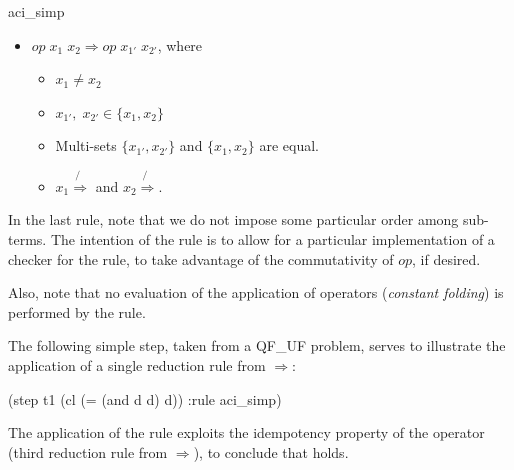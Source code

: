 \begin{RuleDescription}{aci_simp}
\begin{itemize}
\item $op \; x_1 \; x_2 \Rightarrow op \; x_{1'} \; x_{2'}$, 
            where 
            \begin{itemize}
            \item $x_1 \neq x_2$
            \item $x_{1'}, \; x_{2'} \in \{ x_1, x_2\}$
              
            \item Multi-sets $\{x_{1'}, x_{2'}\}$ and $\{x_1, x_2\}$ are equal.
              
              \item $x_1 \not{\Rightarrow}$ and $x_2 \not{\Rightarrow}$.
              
            \end{itemize}
\end{itemize}

In the last rule, note that we do not impose some particular order among 
sub-terms. The intention of the rule is to allow for a particular implementation 
of a checker for the rule, to take advantage of the commutativity of $op$, if 
desired.

Also, note that no evaluation of the application of operators (\emph{constant folding})
is performed by the rule.

\end{RuleDescription}

\begin{RuleExample}
The following simple  step, taken from a \textsf{QF\_UF} 
problem, serves to illustrate the application of a single reduction rule from 
$\Rightarrow$:
\begin{AletheVerb}
(step t1 (cl (= (and d d) d)) :rule aci_simp)
\end{AletheVerb}
The application of the rule exploits the idempotency property of
the  operator (third reduction rule from $\Rightarrow$), to 
conclude that  holds.
\end{RuleExample}

